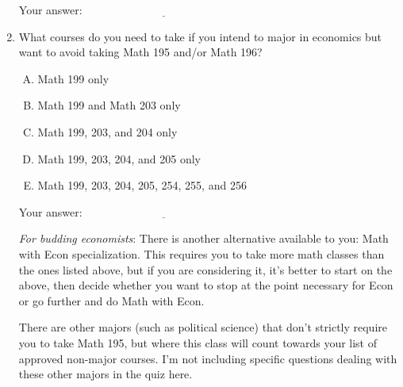 \documentclass[10pt]{amsart}
\begin{document}
\begin{enumerate}
  \vspace{0.1in}
  Your answer: $\underline{\qquad\qquad\qquad\qquad\qquad\qquad\qquad}$
  \vspace{0.1in}

\item What courses do you need to take if you intend to major in
  economics but want to avoid taking Math 195 and/or Math 196?

  \begin{enumerate}[(A)]
  \item Math 199 only
  \item Math 199 and Math 203 only
  \item Math 199, 203, and 204 only
  \item Math 199, 203, 204, and 205 only
  \item Math 199, 203, 204, 205, 254, 255, and 256
  \end{enumerate}

  \vspace{0.1in}
  Your answer: $\underline{\qquad\qquad\qquad\qquad\qquad\qquad\qquad}$
  \vspace{0.1in}

  {\em For budding economists}: There is another alternative available
  to you: Math with Econ specialization. This requires you to take
  more math classes than the ones listed above, but if you are
  considering it, it's better to start on the above, then decide
  whether you want to stop at the point necessary for Econ or go
  further and do Math with Econ.

  There are other majors (such as political science) that don't
  strictly require you to take Math 195, but where this class will
  count towards your list of approved non-major courses. I'm not
  including specific questions dealing with these other majors in the
  quiz here.
\end{enumerate}
\end{document}
